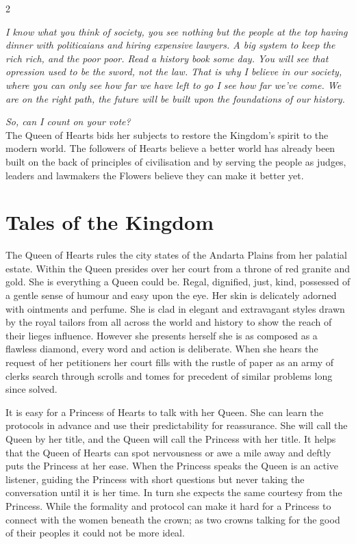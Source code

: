 \label{scha:Hearts}\begin{multicols}{2}\raggedcolumns

\noindent\textit{I know what you think of society, you see nothing but the people at the top having dinner with politicaians and hiring expensive lawyers. A big system to keep the rich rich, and the poor poor. Read a history book some day. You will see that opression used to be the sword, not the law. That is why I believe in our society, where you can only see how far we have left to go I see how far we've come. We are on the right path, the future will be built upon the foundations of our history.}

\textit{So, can I count on your vote?}\\

\noindent The Queen of Hearts bids her subjects to restore the Kingdom's spirit to the modern world. The followers of Hearts believe a better world has already been built on the back of principles of civilisation and by serving the people as judges, leaders and lawmakers the Flowers believe they can make it better yet. 

\section*{Tales of the Kingdom}

The Queen of Hearts rules the city states of the Andarta Plains from her palatial estate. Within the Queen presides over her court from a throne of red granite and gold. She is everything a Queen could be. Regal, dignified, just, kind, possessed of a gentle sense of humour and easy upon the eye. Her skin is delicately adorned with ointments and perfume. She is clad in elegant and extravagant styles drawn by the royal tailors from all across the world and history to show the reach of their lieges influence. However she presents herself she is as composed as a flawless diamond, every word and action is deliberate. When she hears the request of her petitioners her court fills with the rustle of paper as an army of clerks search through scrolls and tomes for precedent of similar problems long since solved.

It is easy for a Princess of Hearts to talk with her Queen. She can learn the protocols in advance and use their predictability for reassurance. She will call the Queen by her title, and the Queen will call the Princess with her title. It helps that the Queen of Hearts can spot nervousness or awe a mile away and deftly puts the Princess at her ease. When the Princess speaks the Queen is an active listener, guiding the Princess with short questions but never taking the conversation until it is her time. In turn she expects the same courtesy from the Princess. While the formality and protocol can make it hard for a Princess to connect with the women beneath the crown; as two crowns talking for the good of their peoples it could not be more ideal.


\end{multicols}
